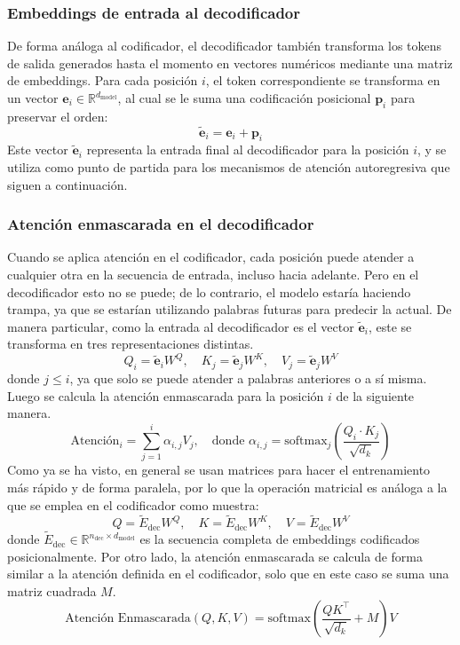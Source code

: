 \documentclass[12pt,letterpaper]{article}
\begin{document}
\subsubsection{Embeddings de entrada al decodificador}
De forma análoga al codificador, el decodificador también transforma los tokens de salida generados hasta el momento en vectores numéricos mediante una matriz de embeddings. Para cada posición \( i \), el token correspondiente se transforma en un vector \( \textbf{e}_i \in \mathbb{R}^{d_{\text{model}}} \), al cual se le suma una codificación posicional \( \textbf{p}_i \) para preservar el orden:
\begin{equation}
\tilde{\textbf{e}}_i = \textbf{e}_i + \textbf{p}_i
\end{equation}
Este vector \( \tilde{\textbf{e}}_i \) representa la entrada final al decodificador para la posición \( i \), y se utiliza como punto de partida para los mecanismos de atención autoregresiva que siguen a continuación.

\subsubsection{Atención enmascarada en el decodificador}
Cuando se aplica atención en el codificador, cada posición puede atender a cualquier otra en la secuencia de entrada, incluso hacia adelante. Pero en el decodificador esto no se puede; de lo contrario, el modelo estaría haciendo trampa, ya que se estarían utilizando palabras futuras para predecir la actual. De manera particular, como la entrada al decodificador es el vector $\tilde{\textbf{e}}_i$, este se transforma en tres representaciones distintas.
\begin{equation}
Q_i = \tilde{\textbf{e}}_i W^Q, \quad K_j = \tilde{\textbf{e}}_j W^K, \quad V_j = \tilde{\textbf{e}}_j W^V
\end{equation}
donde \( j \le i \), ya que solo se puede atender a palabras anteriores o a sí misma.
Luego se calcula la atención enmascarada para la posición \( i \) de la siguiente manera.
\begin{equation}
\text{Atención}_i = \sum_{j=1}^{i} \alpha_{i,j} V_j, \quad \text{donde } \alpha_{i,j} = \text{softmax}_j\left( \frac{Q_i \cdot K_j}{\sqrt{d_k}} \right)
\end{equation}
Como ya se ha visto, en general se usan matrices para hacer el entrenamiento más rápido y de forma paralela, por lo que la operación matricial es análoga a la que se emplea en el codificador como muestra:
\[
Q = \tilde{E}_{\text{dec}} W^Q, \quad K = \tilde{E}_{\text{dec}} W^K, \quad V = \tilde{E}_{\text{dec}} W^V
\]
donde \( \tilde{E}_{\text{dec}} \in \mathbb{R}^{n_{\text{dec}} \times d_{\text{model}}} \) es la secuencia completa de embeddings codificados posicionalmente. Por otro lado, la atención enmascarada se calcula de forma similar a la atención definida en el codificador, solo que en este caso se suma una matriz cuadrada $M$.
\begin{equation}
\text{Atención Enmascarada}(Q, K, V) = \text{softmax}\left( \frac{Q K^\top}{\sqrt{d_k}} + M \right)V
\end{equation}
\end{document}
